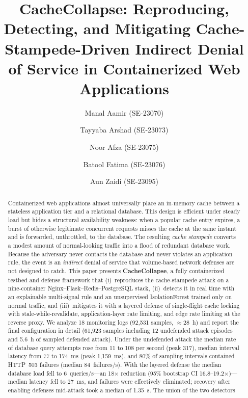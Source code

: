 \documentclass[preprint,12pt]{elsarticle}
\begin{document}
\begin{frontmatter}

\title{CacheCollapse: Reproducing, Detecting, and Mitigating Cache-Stampede-Driven
Indirect Denial of Service in Containerized Web Applications}

\author{Manal Aamir (SE-23070)}
\author{Tayyaba Arshad (SE-23073)}
\author{Noor Afza (SE-23075)}
\author{Batool Fatima (SE-23076)}
\author{Aun Zaidi (SE-23095)}
\address{Department of Software Engineering, NED University of Engineering and
Technology, Karachi, Pakistan}

\begin{abstract}
Containerized web applications almost universally place an in-memory cache between a
stateless application tier and a relational database. This design is efficient under
steady load but hides a structural availability weakness: when a popular cache entry
expires, a burst of otherwise legitimate concurrent requests misses the cache at the
same instant and is forwarded, unthrottled, to the database. The resulting
\emph{cache stampede} converts a modest amount of normal-looking traffic into a flood
of redundant database work. Because the adversary never contacts the database and never
violates an application rule, the event is an \emph{indirect} denial of service that
volume-based network defenses are not designed to catch. This paper presents
\textbf{CacheCollapse}, a fully containerized testbed and defense framework that
(i)~reproduces the cache-stampede attack on a nine-container
Nginx--Flask--Redis--PostgreSQL stack, (ii)~detects it in real time with an
explainable multi-signal rule and an unsupervised IsolationForest trained only on
normal traffic, and (iii)~mitigates it with a layered defense of single-flight cache
locking with stale-while-revalidate, application-layer rate limiting, and edge rate
limiting at the reverse proxy. We analyze 18 monitoring logs (92{,}531 samples,
${\approx}28$~h) and report the final configuration in detail (61{,}923 samples
including 12 undefended attack episodes and 5.6~h of sampled defended attack). Under the undefended attack the median rate of database query attempts rose
from 11 to 108 per second (peak 317), median interval latency from 77 to 174~ms (peak
1{,}159~ms), and 80\% of sampling intervals contained HTTP~503 failures (median
84~failures/s). With the layered defense the median database load fell to
6~queries/s---an 18$\times$ reduction (95\% bootstrap CI 16.8--19.2$\times$)---median
latency fell to 27~ms, and failures were effectively eliminated; recovery after
enabling defenses mid-attack took a median of 1.35~s. The union of the two detectors

\end{abstract}
\end{frontmatter}
\end{document}
